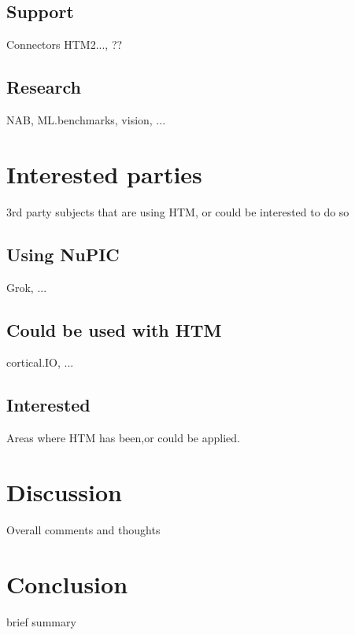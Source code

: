 \documentclass[a4,IEEEconf]{article}
\begin{document}
\subsection{Support}
Connectors HTM2..., ??
\subsection{Research}
NAB, ML.benchmarks, vision, ...

\section{Interested parties}
3rd party subjects that are using HTM, or could be interested to do so
\subsection{Using NuPIC}
Grok, ...
\subsection{Could be used with HTM}
cortical.IO, ...
\subsection{Interested}
Areas where HTM has been,or could be applied. 

\section{Discussion}
Overall comments and thoughts

\section{Conclusion}
brief summary
\end{document}

